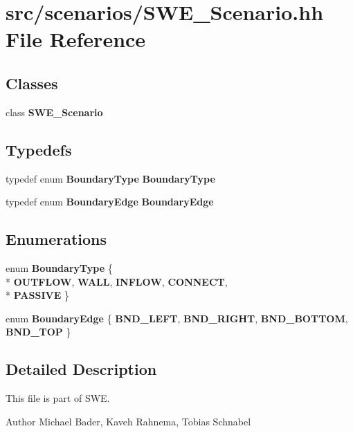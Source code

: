 \section{src/scenarios/\-S\-W\-E\-\_\-\-Scenario.hh File Reference}
\label{SWE__Scenario_8hh}
\subsection*{Classes}
\begin{DoxyCompactItemize}
\item 
class {\bf S\-W\-E\-\_\-\-Scenario}
\end{DoxyCompactItemize}
\subsection*{Typedefs}
\begin{DoxyCompactItemize}
\item 
typedef enum {\bf Boundary\-Type} {\bf Boundary\-Type}
\item 
typedef enum {\bf Boundary\-Edge} {\bf Boundary\-Edge}
\end{DoxyCompactItemize}
\subsection*{Enumerations}
\begin{DoxyCompactItemize}
\item 
enum {\bf Boundary\-Type} \{ \\*
{\bfseries O\-U\-T\-F\-L\-O\-W}, 
{\bfseries W\-A\-L\-L}, 
{\bfseries I\-N\-F\-L\-O\-W}, 
{\bfseries C\-O\-N\-N\-E\-C\-T}, 
\\*
{\bfseries P\-A\-S\-S\-I\-V\-E}
 \}
\item 
enum {\bf Boundary\-Edge} \{ {\bfseries B\-N\-D\-\_\-\-L\-E\-F\-T}, 
{\bfseries B\-N\-D\-\_\-\-R\-I\-G\-H\-T}, 
{\bfseries B\-N\-D\-\_\-\-B\-O\-T\-T\-O\-M}, 
{\bfseries B\-N\-D\-\_\-\-T\-O\-P}
 \}
\end{DoxyCompactItemize}


\subsection{Detailed Description}
This file is part of S\-W\-E.

\begin{DoxyAuthor}{Author}
Michael Bader, Kaveh Rahnema, Tobias Schnabel
\end{DoxyAuthor}
